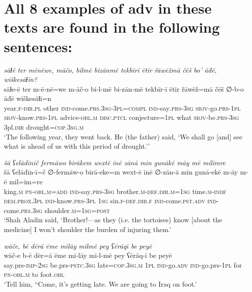 \chapter{All 8 examples of adv in these texts are found in the following sentences:}

\ea \label{ZB.46}
\textit{sāɫē ter mēnēwe, māčo, bilmē bizānmē tekbīrī ētir řāwēžmā čēš bo’ āđē, wiškesāɫīn?} \\ 
\gll sāɫe-ē ter m-ē-nē=we m-āč-o bi-l-mē bi-zān-mē tekbīr-ī ētir řāwēž=mā čēš ∅-b-o āđē wiškesāɫī=n \\ 
 year\textsc{.f}\textsc{-dir}\textsc{.pl} other \textsc{ind-}come\textsc{.prs}\textsc{.3sg}\textsc{-3pl}\textsc{=compl} \textsc{ind-}say\textsc{.prs}\textsc{-3sg} \textsc{sbjv-}go\textsc{.prs}\textsc{-1pl} \textsc{sbjv-}know\textsc{.prs}\textsc{-1pl} advice\textsc{-obl}\textsc{.m} \textsc{disc.ptcl} conjecture\textsc{=1pl} what \textsc{sbjv-}be\textsc{.prs}\textsc{-3sg} 3pl\textsc{.dir} drought\textsc{=cop}\textsc{.3sg}\textsc{.m} \\ 
\glt `The following year, they went back. He (the father) said, ‘We shall go [and] see what is ahead of us with this period of drought.’'
\z 
 
\ea \label{DG.67}
\textit{šā ʕelādīnīč fermāwo birākem wextē īnē zānā min gunākē māy mē milimre} \\ 
\gll šā ʕelādīn-ī=č ∅-fermāw-o birā-eke=m wext-ē īnē ∅-zān-ā min gunā-ekē m-āy m-ē mil=im=re \\ 
 king\textsc{.m} \textsc{pn}\textsc{-obl}\textsc{.m}\textsc{=add} \textsc{ind-}say\textsc{.prs}\textsc{-3sg} brother\textsc{.m}\textsc{-def}\textsc{.dir}\textsc{.m}\textsc{=1sg} time\textsc{.m}\textsc{-indf} \textsc{dem.prox}\textsc{.3pl} \textsc{ind-}know\textsc{.prs}\textsc{-3pl} \textsc{1sg} sin\textsc{\textsc{.f}}\textsc{-def}\textsc{.dir}\textsc{\textsc{.f}} \textsc{ind-}come\textsc{.pst}\textsc{.adv} \textsc{ind-}come\textsc{.prs}\textsc{.3sg} shoulder\textsc{.m}\textsc{=1sg}\textsc{=\textsc{post}} \\ 
\glt `Shah Aladin said, ‘Brother!—as they (i.e. the tortoises) know [about the medicine] I won’t shoulder the burden of injuring them.'
\z 
 
\ea \label{BP.78}
\textit{wāče, bē dērā ēme milāy milmē pey ʕērāqī be peyē} \\ 
\gll wāč-e b-ē dēr=ā ēme mi-lāy mi-l-mē pey ʕērāq-ī be peyē \\ 
 say.prs-\textsc{imp-}\textsc{2sg} be.prs\textsc{-pstc}\textsc{.3sg} late\textsc{=cop}\textsc{.3sg}\textsc{.m} \textsc{1pl} \textsc{ind-}go\textsc{.adv} \textsc{ind-}go.prs\textsc{-\textsc{1pl}} for \textsc{pn}\textsc{-obl}\textsc{.m} to foot\textsc{.obl} \\ 
\glt `Tell him, “Come, it’s getting late. We are going to Iraq on foot.'
\z 
 

